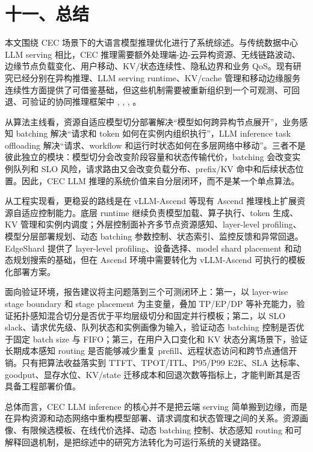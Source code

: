 \section*{十一、总结}

本文围绕 CEC 场景下的大语言模型推理优化进行了系统综述。与传统数据中心 LLM serving 相比，CEC 推理需要额外处理端-边-云异构资源、无线链路波动、边缘节点负载变化、用户移动、KV/状态连续性、隐私边界和业务 QoS。现有研究已经分别在异构推理、LLM serving runtime、KV/cache 管理和移动边缘服务连续性方面提供了可借鉴基础，但这些机制需要被重新组织到一个可观测、可回退、可验证的协同推理框架中 \cite{jiang2023hexgen,yu2022orca,kwon2023efficient,agrawal2024taming,zhong2024distserve}, \cite{duan2022distributed}, \cite{patel2024splitwise}, \cite{qin2025mooncake,liu2024cachegen,srivatsa2025preble,gao2024cost,ouyang2018follow,sheng2024fairness}。

从算法主线看，资源自适应模型切分部署解决“模型如何跨异构节点展开”，业务感知 batching 解决“请求和 token 如何在实例内组织执行”，LLM inference task offloading 解决“请求、workflow 和运行时状态如何在多层网络中移动”。三者不是彼此独立的模块：模型切分会改变阶段容量和状态传输代价，batching 会改变实例队列和 SLO 风险，请求路由又会改变负载分布、prefix/KV 命中和后续状态位置。因此，CEC LLM 推理的系统价值来自分层闭环，而不是某一个单点算法。

从工程实现看，更稳妥的路线是在 vLLM-Ascend 等现有 Ascend 推理栈上扩展资源自适应控制能力。底层 runtime 继续负责模型加载、算子执行、token 生成、KV 管理和实例内调度；外层控制面补齐多节点资源感知、layer-level profiling、模型分层部署规划、动态 batching 参数控制、状态索引、监控反馈和异常回退。EdgeShard 提供了 layer-level profiling、设备选择、model shard placement 和动态规划搜索的基础，但在 Ascend 环境中需要转化为 vLLM-Ascend 可执行的模板化部署方案。

面向验证环境，报告建议将主问题落到三个可测闭环上：第一，以 layer-wise stage boundary 和 stage placement 为主变量，叠加 TP/EP/DP 等补充能力，验证拓扑感知混合切分是否优于平均层级切分和固定并行模板；第二，以 SLO slack、请求优先级、队列状态和实例画像为输入，验证动态 batching 控制是否优于固定 batch size 与 FIFO；第三，在用户入口变化和 KV 状态分离场景下，验证长期成本感知 routing 是否能够减少重复 prefill、远程状态访问和跨节点通信开销。只有把算法收益落实到 TTFT、TPOT/ITL、P95/P99 E2E、SLA 达标率、goodput、显存水位、KV/state 迁移成本和回退次数等指标上，才能判断其是否具备工程部署价值。

总体而言，CEC LLM inference 的核心并不是把云端 serving 简单搬到边缘，而是在异构资源和动态网络中重构模型部署、请求调度和状态管理之间的关系。资源画像、有限候选模板、在线代价选择、动态 batching 控制、状态感知 routing 和可解释回退机制，是把综述中的研究方法转化为可运行系统的关键路径。

